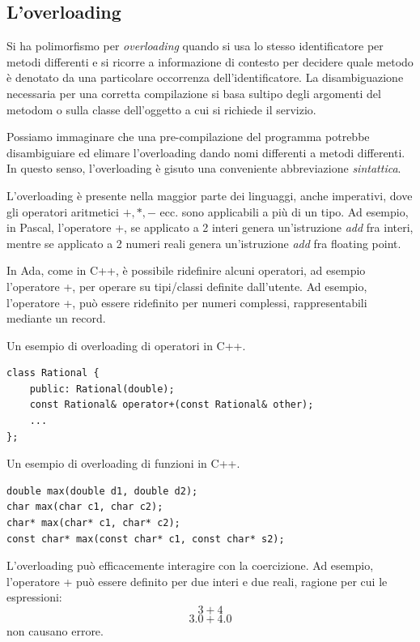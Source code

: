 \documentclass[12pt]{report}
\begin{document}
\subsection{L'overloading}
Si ha polimorfismo per \textit{overloading} quando si usa lo stesso identificatore per metodi differenti e si ricorre a informazione di contesto per decidere quale metodo è denotato da una particolare occorrenza dell'identificatore. La disambiguazione necessaria per una corretta compilazione si basa sultipo degli argomenti del metodom o sulla classe dell'oggetto a cui si richiede il servizio.

Possiamo immaginare che una pre-compilazione del programma potrebbe disambiguiare ed elimare l'overloading dando nomi differenti a metodi differenti. In questo senso, l'overloading è gisuto una conveniente abbreviazione \textit{sintattica}.

L'overloading è presente nella maggior parte dei linguaggi, anche imperativi, dove gli operatori aritmetici $+, *, -$ ecc. sono applicabili a più di un tipo. Ad esempio, in Pascal, l'operatore +, se applicato a 2 interi genera un'istruzione \textit{add} fra interi, mentre se applicato a 2 numeri reali genera un'istruzione \textit{add} fra floating point.

In Ada, come in C++, è possibile ridefinire alcuni operatori, ad esempio l'operatore +, per operare su tipi/classi definite dall'utente. Ad esempio, l'operatore +, può essere ridefinito per numeri complessi, rappresentabili mediante un record.

Un esempio di overloading di operatori in C++.
\begin{lstlisting}[style=cppstyle]
class Rational {
	public: Rational(double);
	const Rational& operator+(const Rational& other);
	...
};\end{lstlisting}

Un esempio di overloading di funzioni in C++.
\begin{lstlisting}[style=cppstyle]
double max(double d1, double d2);
char max(char c1, char c2);
char* max(char* c1, char* c2);
const char* max(const char* c1, const char* s2);\end{lstlisting}

L'overloading può efficacemente interagire con la coercizione. Ad esempio, l'operatore + può essere definito per due interi e due reali, ragione per cui le espressioni:
\[
3+ 4
\]
\[
3.0 + 4.0
\]
non causano errore.
\end{document}
